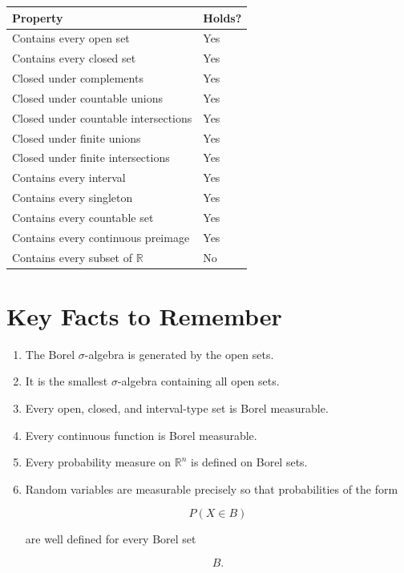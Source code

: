\documentclass[11pt]{article}
\begin{document}
	\begin{center}
		\renewcommand{\arraystretch}{1.5}
		\begin{tabular}{|l|l|}
			\hline
			Property & Holds?\\
			\hline
			Contains every open set & Yes\\
			Contains every closed set & Yes\\
			Closed under complements & Yes\\
			Closed under countable unions & Yes\\
			Closed under countable intersections & Yes\\
			Closed under finite unions & Yes\\
			Closed under finite intersections & Yes\\
			Contains every interval & Yes\\
			Contains every singleton & Yes\\
			Contains every countable set & Yes\\
			Contains every continuous preimage & Yes\\
			Contains every subset of $\mathbb R$ & No\\
			\hline
		\end{tabular}
	\end{center}
	
	
	\section{Key Facts to Remember}
	
	\begin{enumerate}[label=\arabic*.]
		\item The Borel $\sigma$-algebra is generated by the open sets.
		
		\item It is the smallest $\sigma$-algebra containing all open sets.
		
		\item Every open, closed, and interval-type set is Borel measurable.
		
		\item Every continuous function is Borel measurable.
		
		\item Every probability measure on $\mathbb R^n$ is defined on Borel sets.
		
		\item Random variables are measurable precisely so that probabilities of the
		form
		
		\[
		P(X\in B)
		\]
		
		are well defined for every Borel set
		
		\[
		B.
		\]
	\end{enumerate}
	
\end{document}
